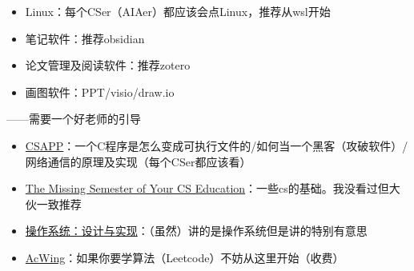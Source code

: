 \documentclass{ctexbeamer} %
\begin{document}
\begin{frame}
	\begin{itemize}
		\item Linux：每个CSer（AIAer）都应该会点Linux，推荐从wsl开始
		\item 笔记软件：推荐obsidian
		\item 论文管理及阅读软件：推荐zotero
		\item 画图软件：PPT/visio/draw.io
	\end{itemize}
\end{frame}

\begin{frame}
	\begin{flushright}
		——需要一个好老师的引导
	\end{flushright}
	\begin{itemize}
		\item \href{https://www.bilibili.com/video/BV1iW411d7hd/}{CSAPP}：一个C程序是怎么变成可执行文件的/如何当一个黑客（攻破软件）/网络通信的原理及实现（每个CSer都应该看）
		\item \href{https://www.bilibili.com/video/BV1x7411H7wa/}{The Missing Semester of Your CS Education}：一些cs的基础。我没看过但大伙一致推荐
		\item \href{https://space.bilibili.com/202224425/channel/collectiondetail?sid=192498}{操作系统：设计与实现}：（虽然）讲的是操作系统但是讲的特别有意思
		\item \href{https://www.acwing.com/}{AcWing}：如果你要学算法（Leetcode）不妨从这里开始（收费）
	\end{itemize}
\end{frame}

{
}
\end{document}
